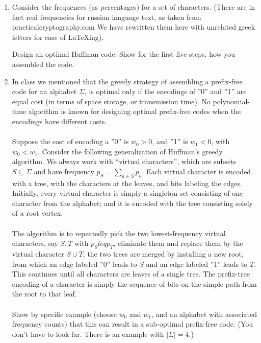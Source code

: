 \documentclass{article}
\begin{document}
\begin{enumerate}[label= (\alph*)]
      \item Consider the frequences (as percentages) for a set of characters. (There are
            in fact real frequencies for russian language text, as taken from
            practicalcryptography.com We have rewritten them here with unrelated greek letters
            for ease of \LaTeX{}ing).

            Design an optimal Huffman code. Show for the first five steps, how you
            assembled the code.

      \item In class we mentioned that the greedy strategy of assembling a prefix-free
            code for an alphabet \(\Sigma \), is optimal only if the encodings of ''0''
            and ''1'' are equal cost (in terms of space storage, or transmission time). No
            polynomial-time algorithm is known for designing optimal prefix-free codes
            when the encodings have different costs.

            \paragraph{} Suppose the cost of encoding a ''0'' is \(w_0 > 0\), and ''1'' is
            \(w_1 < 0\), with \(w_0 < w_1\). Consider the following generalization of
            Huffman's greedy algorithm. We always work with ``virtual characters'', which
            are subsets \(S \subseteq \Sigma \) and have frequency \(p_S = \sum_{a\in
                  S}p_a\). Each virtual character is encoded with a tree, with the characters at
            the leaves, and bits labeling the edges. Initially, every virtual character is
            simply a singleton set consisting of one character from the alphabet; and it is
            encoded with the tree consisting solely of a root vertex.
            \paragraph{} The algorithm is to repeatedly pick the two lowest-frequency
            virtual characters, say \(S, T\) with \(p_S leq p_T\), eliminate them and
            replace them by the virtual character \(S \cup T\); the two trees are merged
            by installing a new root, from which an edge labeled ''0'' leads to \(S\) and
            an edge labeled ''1'' leads to \(T\). This continues until all characters are
            leaves of a single tree. The prefix-tree encoding of a character is simply the
            sequence of bits on the simple path from the root to that leaf.
            \paragraph{} Show by specific example (choose \(w_0\) and \(w_1\), and an
            alphabet with associated frequency counts) that this can result in a
            sub-optimal prefix-free code. (You don't have to look far. There is an example
            with \(|\Sigma| = 4\).)
\end{enumerate}
\end{document}
